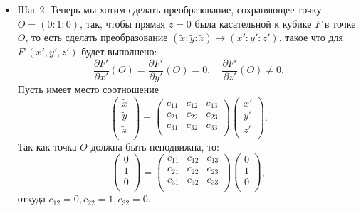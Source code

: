 \documentclass[a4paper,12pt]{article}
\theoremstyle{definition}
\begin{document}
\begin{itemize}[leftmargin=0.6cm]
        \item Шаг 2. Теперь мы хотим сделать преобразование,
        сохраняющее точку \(O = (0 : 1 : 0)\), так, чтобы
        прямая \(z = 0\) была касательной к кубике \(\widetilde{F}\) в точке
        \(O\), то есть сделать преобразование \((\widetilde{x} :
        \widetilde{y} : \widetilde{z}) \to (x' : y' : z')\), такое что
        для \(F'(x', y', z')\) будет выполнено: 
         \[
        \frac{\partial F'}{\partial x'} (O) = \frac{\partial F'}{\partial y'}
        (O) = 0, \quad \frac{\partial F'}{\partial z'} (O) \ne 0
        .\]
        Пусть имеет место соотношение
        \[
        \begin{pmatrix}
            \widetilde{x} \\
            \widetilde{y} \\
            \widetilde{z} \\
        \end{pmatrix} 
        = 
        \begin{pmatrix}
            c_{11} & c_{12} & c_{13} \\
            c_{21} & c_{22} & c_{23} \\
            c_{31} & c_{32} & c_{33} \\
        \end{pmatrix}
        \begin{pmatrix}
            x' \\
            y' \\
            z' \\
        \end{pmatrix}
        .\] 
        Так как точка \(O\) должна быть неподвижна, то:
        \[
        \begin{pmatrix}
            0 \\
            1 \\
            0 \\
        \end{pmatrix}
        = 
        \begin{pmatrix}
            c_{11} & c_{12} & c_{13} \\
            c_{21} & c_{22} & c_{23} \\
            c_{31} & c_{32} & c_{33} \\
        \end{pmatrix}
        \begin{pmatrix}
            0 \\
            1 \\
            0 \\
        \end{pmatrix}
        ,\] 
        откуда \(c_{12} = 0, c_{22} = 1, c_{32} = 0\). 
            

\end{itemize}
\end{document}
